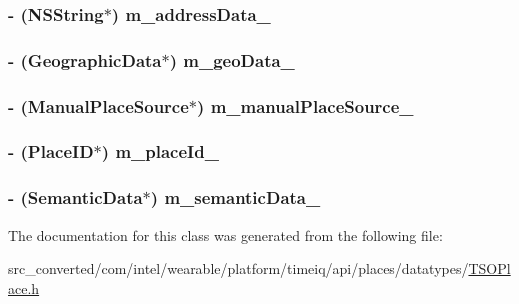 \subsubsection[{m\+\_\+address\+Data\+\_\+}]{\setlength{\rightskip}{0pt plus 5cm}-\/ (N\+S\+String$\ast$) m\+\_\+address\+Data\+\_\+}\label{interface_t_s_o_place_a0729b8a1a5ea8ae02f5ddb14f125ae23}
\hypertarget{interface_t_s_o_place_aa418240a90d37a50ea7027c03bdeac4c}{}
\subsubsection[{m\+\_\+geo\+Data\+\_\+}]{\setlength{\rightskip}{0pt plus 5cm}-\/ ({\bf Geographic\+Data}$\ast$) m\+\_\+geo\+Data\+\_\+}\label{interface_t_s_o_place_aa418240a90d37a50ea7027c03bdeac4c}
\hypertarget{interface_t_s_o_place_a8c97fa71cf0cba8934e98d4debc8b86b}{}
\subsubsection[{m\+\_\+manual\+Place\+Source\+\_\+}]{\setlength{\rightskip}{0pt plus 5cm}-\/ (Manual\+Place\+Source$\ast$) m\+\_\+manual\+Place\+Source\+\_\+}\label{interface_t_s_o_place_a8c97fa71cf0cba8934e98d4debc8b86b}
\hypertarget{interface_t_s_o_place_ae00ab980b434ac17af38e826ca83c1cf}{}
\subsubsection[{m\+\_\+place\+Id\+\_\+}]{\setlength{\rightskip}{0pt plus 5cm}-\/ (Place\+I\+D$\ast$) m\+\_\+place\+Id\+\_\+}\label{interface_t_s_o_place_ae00ab980b434ac17af38e826ca83c1cf}
\hypertarget{interface_t_s_o_place_a12cf8e7b5eadbfdb8b0f23d7474f85d2}{}
\subsubsection[{m\+\_\+semantic\+Data\+\_\+}]{\setlength{\rightskip}{0pt plus 5cm}-\/ ({\bf Semantic\+Data}$\ast$) m\+\_\+semantic\+Data\+\_\+}\label{interface_t_s_o_place_a12cf8e7b5eadbfdb8b0f23d7474f85d2}


The documentation for this class was generated from the following file\+:\begin{DoxyCompactItemize}
\item 
src\+\_\+converted/com/intel/wearable/platform/timeiq/api/places/datatypes/\hyperlink{_t_s_o_place_8h}{T\+S\+O\+Place.\+h}\end{DoxyCompactItemize}
